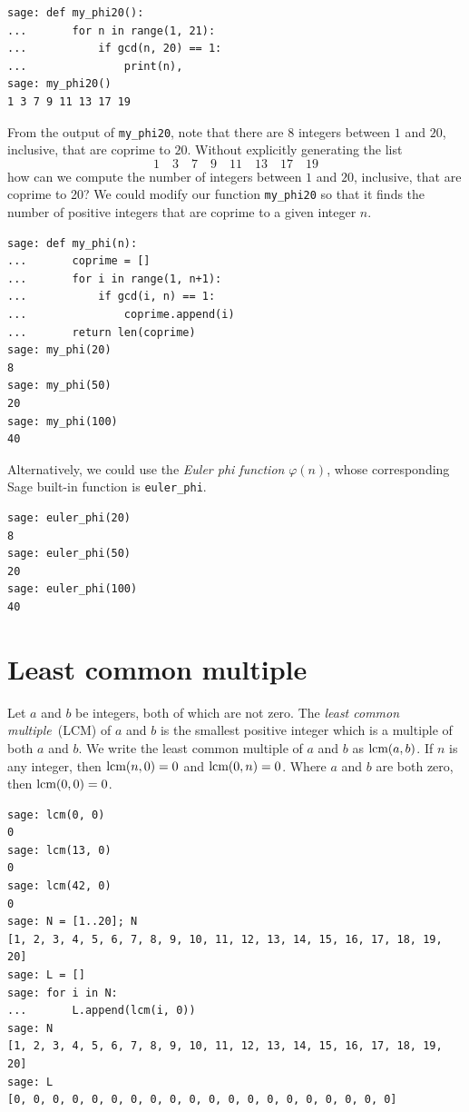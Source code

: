 \begin{lstlisting}
sage: def my_phi20():
...       for n in range(1, 21):
...           if gcd(n, 20) == 1:
...               print(n),
sage: my_phi20()
1 3 7 9 11 13 17 19
\end{lstlisting}
%
From the output of \verb!my_phi20!, note that there are $8$ integers
between $1$ and $20$, inclusive, that are coprime to $20$. Without
explicitly generating the list
%
\begin{equation}
\label{eq:integers_coprime_to_20}
1 \quad 3 \quad 7 \quad 9 \quad 11 \quad 13 \quad 17 \quad 19
\end{equation}
%
how can we compute the number of integers between $1$ and $20$,
inclusive, that are coprime to 20? We could modify our function
\verb!my_phi20! so that it finds the number of positive integers that
are coprime to a given integer $n$.

\begin{lstlisting}
sage: def my_phi(n):
...       coprime = []
...       for i in range(1, n+1):
...           if gcd(i, n) == 1:
...               coprime.append(i)
...       return len(coprime)
sage: my_phi(20)
8
sage: my_phi(50)
20
sage: my_phi(100)
40
\end{lstlisting}

Alternatively, we could use the \emph{Euler phi function}
$\varphi(n)$, whose corresponding Sage built-in function is
\verb!euler_phi!.

\begin{lstlisting}
sage: euler_phi(20)
8
sage: euler_phi(50)
20
sage: euler_phi(100)
40
\end{lstlisting}



\section{Least common multiple}

Let $a$ and $b$ be integers, both of which are not zero. The
\emph{least common multiple}~(LCM) of $a$ and $b$ is the smallest
positive integer which is a multiple of both $a$ and $b$. We write the
least common multiple of $a$ and $b$ as $\operatorname*{\text{lcm}}(a, b)$. If $n$ is any
integer, then $\operatorname*{\text{lcm}}(n, 0) = 0$ and $\operatorname*{\text{lcm}}(0, n) = 0$. Where $a$ and $b$
are both zero, then $\operatorname*{\text{lcm}}(0,0) = 0$.

\begin{lstlisting}
sage: lcm(0, 0)
0
sage: lcm(13, 0)
0
sage: lcm(42, 0)
0
sage: N = [1..20]; N
[1, 2, 3, 4, 5, 6, 7, 8, 9, 10, 11, 12, 13, 14, 15, 16, 17, 18, 19, 20]
sage: L = []
sage: for i in N:
...       L.append(lcm(i, 0))
sage: N
[1, 2, 3, 4, 5, 6, 7, 8, 9, 10, 11, 12, 13, 14, 15, 16, 17, 18, 19, 20]
sage: L
[0, 0, 0, 0, 0, 0, 0, 0, 0, 0, 0, 0, 0, 0, 0, 0, 0, 0, 0, 0]
\end{lstlisting}

